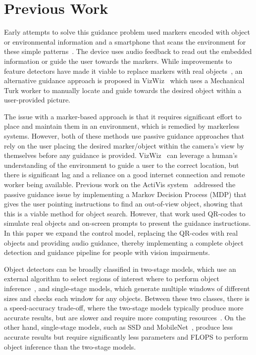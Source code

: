 \documentclass[runningheads]{llncs}
\begin{document}
\section{Previous Work}\label{sec:previous-work}

Early attempts to solve this guidance problem used markers encoded with object or environmental information and a smartphone that scans the environment for these simple patterns~\cite{gude2013blind,manduchi2012mobile}. 
The device uses audio feedback to read out the embedded information or guide the user towards the markers. 
While improvements to feature detectors have made it viable to replace markers with real objects~\cite{redmon2016you}, an alternative guidance approach is proposed in VizWiz~\cite{bigham2010vizwiz} which uses a Mechanical Turk worker to manually locate and guide towards the desired object within a user-provided picture. 

The issue with a marker-based approach is that it requires significant effort to place and maintain them in an environment, which is remedied by markerless systems.
However, both of these methods use passive guidance approaches that rely on the user placing the desired marker/object within the camera's view by themselves before any guidance is provided. 
VizWiz~\cite{bigham2010vizwiz} can leverage a human's understanding of the environment to guide a user to the correct location, but there is significant lag and a reliance on a good internet connection and remote worker being available. 
Previous work on the ActiVis system~\cite{lock2019active} addressed the passive guidance issue by implementing a Markov Decision Process (MDP) that gives the user pointing instructions to find an out-of-view object, showing that this is a viable method for object search. 
However, that work used QR-codes to simulate real objects and on-screen prompts to present the guidance instructions.
In this paper we expand the control model, replacing the QR-codes with real objects and providing audio guidance, thereby implementing a complete object detection and guidance pipeline for people with vision impairments.  

Object detectors can be broadly classified in two-stage models, which use an external algorithm to select regions of interest where to perform object inference~\cite{ren2015faster}, and single-stage models, which generate multiple windows of different sizes and checks each window for any objects.
Between these two classes, there is a speed-accuracy trade-off, where the two-stage models typically produce more accurate results, but are slower and require more computing resources~\cite{liu2018deeplf}.
On the other hand, single-stage models, such as SSD and MobileNet~\cite{liu2016ssd,howard2017mobilenet}, produce less accurate results but require significantly less parameters and FLOPS to perform object inference than the two-stage models. 
\end{document}
